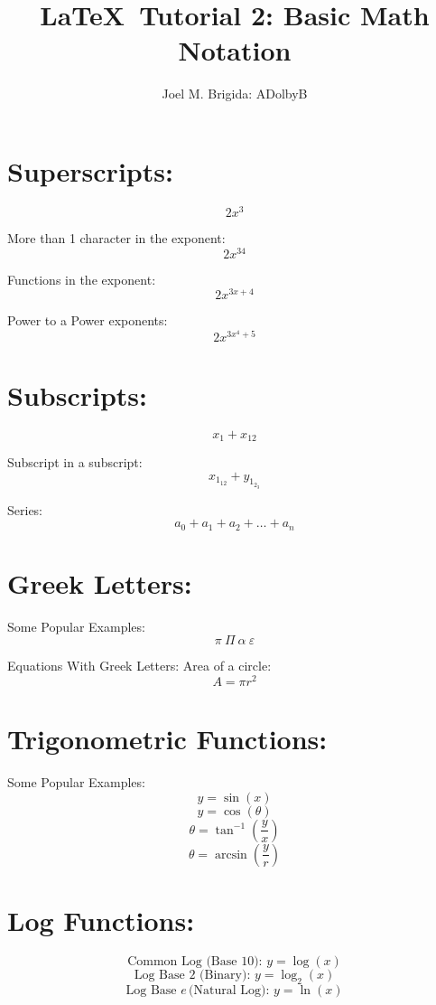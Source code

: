 \documentclass[11pt]{article} %
\begin{document}
\title{\LaTeX\ Tutorial 2: Basic Math Notation}
\author{Joel M. Brigida: ADolbyB}
\maketitle %

\section{Superscripts:}
\thispagestyle{empty} %

$$2x^3$$

More than 1 character in the exponent: $$2x^{34}$$

Functions in the exponent: $$2x^{3x+4}$$

Power to a Power exponents: $$2x^{3x^{4}+5}$$

\section{Subscripts:}

$$x_1 + x_{12}$$

Subscript in a subscript: $$x_{1_{12}} + y_{1_{2_{3}}}$$

Series: $$a_0 + a_1 + a_2 + \ldots + a_n$$

\section{Greek Letters:}

Some Popular Examples: $$\pi \ \Pi \ \alpha \ \varepsilon $$

Equations With Greek Letters: Area of a circle:$$A = \pi r^{2}$$

\section{Trigonometric Functions:}

Some Popular Examples: $$y = \sin(x) $$
$$y = \cos(\theta)$$
$$\theta = \tan^{-1} \left( \frac{y}{x} \right) $$
$$\theta = \arcsin \left( \frac{y}{r} \right) $$

\section{Log Functions:}

$$ \text{Common Log (Base 10): } y = \log (x) $$
$$ \text{Log Base 2 (Binary): } y = \log_{2}(x) $$
$$ \text{Log Base } e \, \text{(Natural Log): } y = \ln (x) $$
\end{document}
